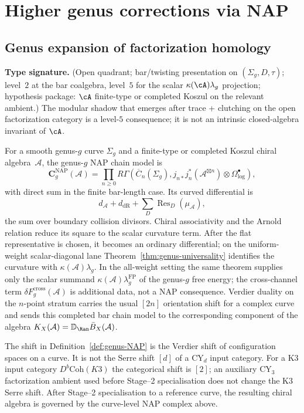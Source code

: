 \section{Higher genus corrections via NAP}

\subsection{Genus expansion of factorization homology}

\begin{definition}\label{def:genus-NAP}
\textbf{Type signature.} (Open quadrant; bar/twisting presentation on
$(\Sigma_g, D, \tau)$; level~$2$ at the bar coalgebra, level~$5$ for
the scalar $\kappa(\cA)\lambda_g$ projection; hypothesis package:
$\cA$ finite-type or completed Koszul on the relevant ambient.) The
modular shadow that emerges after trace + clutching on the open
factorization category is a level-$5$ consequence; it is not an
intrinsic closed-algebra invariant of $\cA$.

For a smooth genus-$g$ curve $\Sigma_g$ and a finite-type or completed
Koszul chiral algebra~$\mathcal{A}$, the genus-$g$ NAP chain model is
\[
\mathbf{C}^{\mathrm{NAP}}_g(\mathcal{A})
=
\prod_{n\geq0}
R\Gamma\!\left(
\overline{C}_n(\Sigma_g),
j_{n*}j_n^*(\mathcal{A}^{\boxtimes n})
\otimes\Omega^\bullet_{\log}
\right),
\]
with direct sum in the finite bar-length case. Its curved
differential is
\[
d_{\mathcal{A}}+d_{\mathrm{dR}}
+\sum_D \operatorname{Res}_D(\mu_{\mathcal{A}}),
\]
the sum over boundary collision divisors. Chiral associativity and
the Arnold relation reduce its square to the scalar curvature term.
After the flat representative is chosen, it becomes an ordinary
differential; on the uniform-weight scalar-diagonal lane
Theorem~\ref{thm:genus-universality} identifies the curvature with
$\kappa(\mathcal{A})\lambda_g$. In the all-weight setting the same
theorem supplies only the scalar summand
$\kappa(\mathcal{A})\lambda_g^{\mathrm{FP}}$ of the genus-$g$ free
energy; the cross-channel term
$\delta F_g^{\mathrm{cross}}(\mathcal{A})$ is additional data, not a
NAP consequence.
Verdier duality on the $n$-point stratum carries the usual
$[2n]$ orientation shift for a complex curve and sends this completed
bar chain model to the corresponding component of the algebra
$K_X(\mathcal A)=\mathbb D_{\Ran}\bar B_X(\mathcal A)$.
\end{definition}

\begin{remark}
\label{rem:curve-vs-cy-shifts}
The shift in Definition~\ref{def:genus-NAP} is the Verdier shift of
configuration spaces on a curve. It is not the Serre shift $[d]$ of a
$\mathrm{CY}_d$ input category. For a K3 input category
$D^b\mathrm{Coh}(K3)$ the categorical shift is $[2]$; an auxiliary
CY$_3$ factorization ambient used before Stage--2 specialisation does
not change the K3 Serre shift. After Stage--2 specialisation to a
reference curve, the resulting chiral algebra is governed by the
curve-level NAP complex above.
\end{remark}

